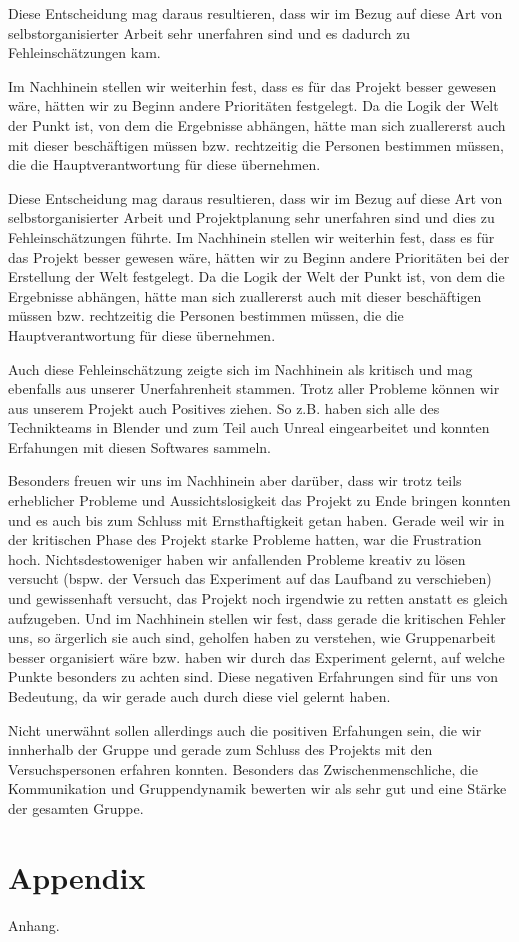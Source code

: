 \documentclass{Bericht}
\begin{document}
 	Diese Entscheidung mag daraus resultieren, dass wir im Bezug auf diese Art von selbstorganisierter Arbeit sehr unerfahren sind und es dadurch zu Fehleinschätzungen kam.
	
		Im Nachhinein stellen wir weiterhin fest, dass es für das Projekt besser gewesen wäre, hätten wir zu Beginn andere Prioritäten festgelegt. Da die Logik der Welt der Punkt ist, von dem die Ergebnisse abhängen, hätte man sich zuallererst auch mit dieser beschäftigen müssen bzw. rechtzeitig die Personen bestimmen müssen, die die Hauptverantwortung für diese übernehmen.
		
	Diese Entscheidung mag daraus resultieren, dass wir im Bezug auf diese Art von selbstorganisierter Arbeit und Projektplanung sehr unerfahren sind und dies zu Fehleinschätzungen führte.
	Im Nachhinein stellen wir weiterhin fest, dass es für das Projekt besser gewesen wäre, hätten wir zu Beginn andere Prioritäten bei der Erstellung der Welt festgelegt. Da die Logik der Welt der Punkt ist, von dem die Ergebnisse abhängen, hätte man sich zuallererst auch mit dieser beschäftigen müssen bzw. rechtzeitig die Personen bestimmen müssen, die die Hauptverantwortung für diese übernehmen.
	
	Auch diese Fehleinschätzung zeigte sich im Nachhinein als kritisch und mag ebenfalls aus unserer Unerfahrenheit stammen.
	Trotz aller Probleme können wir aus unserem Projekt auch Positives ziehen. So z.B. haben sich alle des Technikteams in Blender und zum Teil auch Unreal eingearbeitet und konnten Erfahungen mit diesen Softwares sammeln.
		
	Besonders freuen wir uns im Nachhinein aber darüber, dass wir trotz teils erheblicher Probleme und Aussichtslosigkeit das Projekt zu Ende bringen konnten und es auch bis zum Schluss mit Ernsthaftigkeit getan haben. Gerade weil wir in der kritischen Phase des Projekt starke Probleme hatten, war die Frustration hoch. Nichtsdestoweniger haben wir anfallenden Probleme kreativ zu lösen versucht (bspw. der Versuch das Experiment auf das Laufband zu verschieben) und gewissenhaft versucht, das Projekt noch irgendwie zu retten anstatt es gleich aufzugeben. Und im Nachhinein stellen wir fest, dass gerade die kritischen Fehler uns, so ärgerlich sie auch sind, geholfen haben zu verstehen, wie Gruppenarbeit besser organisiert wäre bzw. haben wir durch das Experiment gelernt, auf welche Punkte besonders zu achten sind. Diese negativen Erfahrungen sind für uns von Bedeutung, da wir gerade auch durch diese viel gelernt haben.
	
Nicht unerwähnt sollen allerdings auch die positiven Erfahungen sein, die wir innherhalb der Gruppe und gerade zum Schluss des Projekts mit den Versuchspersonen erfahren konnten. Besonders das Zwischenmenschliche, die Kommunikation und Gruppendynamik bewerten wir als sehr gut und eine Stärke der gesamten Gruppe. 

\newpage
\section{Appendix} %
	Anhang.
	
\vfill %

\printbibliography
\end{document}
